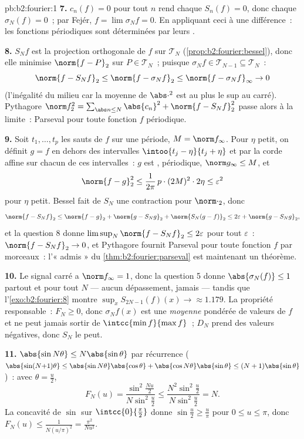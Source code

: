 \begin{solution}{pb:b2:fourier:1}
\textbf{7.} $c_n(f) = 0$ pour tout $n$ rend chaque $S_n(f) = 0$,
donc chaque $\sigma_N(f) = 0$~; par Fejér, $f = \lim\sigma_Nf =
0$. En appliquant ceci à une différence~: les fonctions 
périodiques sont déterminées par leurs .

\textbf{8.} $S_Nf$ est la projection orthogonale de $f$ sur
$\mathcal T_N$ (\cref{prop:b2:fourier:bessel}), donc elle minimise
$\norm{f - P}_2$ sur $P \in \mathcal T_N$~; puisque $\sigma_Nf
\in \mathcal T_{N-1} \subseteq \mathcal T_N$~:
\[
\norm{f - S_Nf}_2 \leq \norm{f - \sigma_Nf}_2
\leq \norm{f - \sigma_Nf}_\infty \to 0
\]
(l'inégalité du milieu car la moyenne de $\abs\cdot^2$ est au plus
le sup au carré). Pythagore $\norm f_2^2 = \sum_{\abs
n\leq N}\abs{c_n}^2 + \norm{f - S_Nf}_2^2$ passe alors à la
limite~: Parseval pour toute fonction $f$  périodique.

\textbf{9.} Soit $t_1, \dots, t_p$ les sauts de $f$ sur une
période, $M = \norm f_\infty$. Pour $\eta$ petit, on définit $g = f$
en dehors des intervalles $\intoo{t_j - \eta}{t_j + \eta}$ et par la
corde affine sur chacun de ces intervalles~: $g$ est ,
périodique, $\norm g_\infty \leq M$, et
\[
\norm{f - g}_2^2 \leq \frac{1}{2\pi}\,p\cdot(2M)^2\cdot2\eta
\leq \varepsilon^2
\]
pour $\eta$ petit. Bessel fait de $S_N$ une contraction pour
$\norm\cdot_2$, donc
\[
\norm{f - S_Nf}_2
\leq \norm{f - g}_2 + \norm{g - S_Ng}_2 + \norm{S_N(g -
f)}_2
\leq 2\varepsilon + \norm{g - S_Ng}_2 ,
\]
et la question 8 donne $\limsup_N\norm{f - S_Nf}_2 \leq
2\varepsilon$ pour tout $\varepsilon$~: $\norm{f - S_Nf}_2 \to
0$, et Pythagore fournit Parseval pour toute fonction $f$ 
par morceaux~: l'« admis » du \cref{thm:b2:fourier:parseval} est
maintenant un théorème.

\textbf{10.} Le signal carré a $\norm f_\infty = 1$, donc la
question 5 donne $\abs{\sigma_N(f)} \leq 1$ partout et pour tout
$N$ --- aucun dépassement, jamais --- tandis que
l'\cref{exo:b2:fourier:8} montre $\sup_xS_{2N-1}(f)(x) \to
\approx 1.179$. La propriété responsable~: $F_N \geq 0$, donc
$\sigma_Nf(x)$ est une \emph{moyenne} pondérée de valeurs de $f$
et ne peut jamais sortir de $\intcc{\min f}{\max f}$~; $D_N$ prend
des valeurs négatives, donc $S_N$ le peut.

\textbf{11.} $\abs{\sin N\theta} \leq N\abs{\sin\theta}$ par
récurrence ($\abs{\sin(N{+}1)\theta} \leq
\abs{\sin N\theta}\abs{\cos\theta} +
\abs{\cos N\theta}\abs{\sin\theta} \leq
(N+1)\abs{\sin\theta}$)~: avec $\theta = \frac u2$,
\[
F_N(u) = \frac{\sin^2\frac{Nu}2}{N\sin^2\frac u2}
\leq \frac{N^2\sin^2\frac u2}{N\sin^2\frac u2} = N .
\]
La concavité de $\sin$ sur $\intcc{0}{\frac\pi2}$ donne
$\sin\frac u2 \geq \frac{u}{\pi}$ pour $0 \leq u \leq \pi$, donc
$F_N(u) \leq \frac{1}{N(u/\pi)^2} = \frac{\pi^2}{Nu^2}$.


\end{solution}
